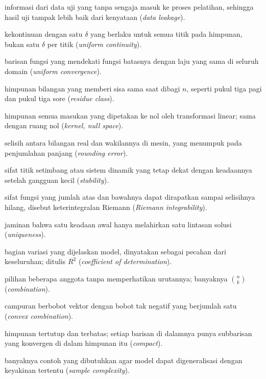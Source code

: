 \begin{description}[style=nextline,itemsep=0.35em]
  \item[Kebocoran data] informasi dari data uji yang tanpa sengaja masuk ke proses pelatihan, sehingga hasil uji tampak lebih baik dari kenyataan (\emph{data leakage}).
  \item[Kekontinuan seragam] kekontinuan dengan satu $\delta$ yang berlaku untuk semua titik pada himpunan, bukan satu $\delta$ per titik (\emph{uniform continuity}).
  \item[Kekonvergenan seragam] barisan fungsi yang mendekati fungsi batasnya dengan laju yang sama di seluruh domain (\emph{uniform convergence}).
  \item[Kelas sisa] himpunan bilangan yang memberi sisa sama saat dibagi $n$, seperti pukul tiga pagi dan pukul tiga sore (\emph{residue class}).
  \item[Kernel] himpunan semua masukan yang dipetakan ke nol oleh transformasi linear; sama dengan ruang nol (\emph{kernel, null space}).
  \item[Kesalahan pembulatan] selisih antara bilangan real dan wakilannya di mesin, yang menumpuk pada penjumlahan panjang (\emph{rounding error}).
  \item[Kestabilan] sifat titik setimbang atau sistem dinamik yang tetap dekat dengan keadaannya setelah gangguan kecil (\emph{stability}).
  \item[Keterintegralan] sifat fungsi yang jumlah atas dan bawahnya dapat dirapatkan sampai selisihnya hilang, disebut keterintegralan Riemann (\emph{Riemann integrability}).
  \item[Ketunggalan] jaminan bahwa satu keadaan awal hanya melahirkan satu lintasan solusi (\emph{uniqueness}).
  \item[Koefisien determinasi] bagian variasi yang dijelaskan model, dinyatakan sebagai pecahan dari keseluruhan; ditulis $R^2$ (\emph{coefficient of determination}).
  \item[Kombinasi] pilihan beberapa anggota tanpa memperhatikan urutannya; banyaknya $\binom{n}{k}$ (\emph{combination}).
  \item[Kombinasi konveks] campuran berbobot vektor dengan bobot tak negatif yang berjumlah satu (\emph{convex combination}).
  \item[Kompak] himpunan tertutup dan terbatas; setiap barisan di dalamnya punya subbarisan yang konvergen di dalam himpunan itu (\emph{compact}).
  \item[Kompleksitas sampel] banyaknya contoh yang dibutuhkan agar model dapat digeneralisasi dengan keyakinan tertentu (\emph{sample complexity}).

\end{description}
